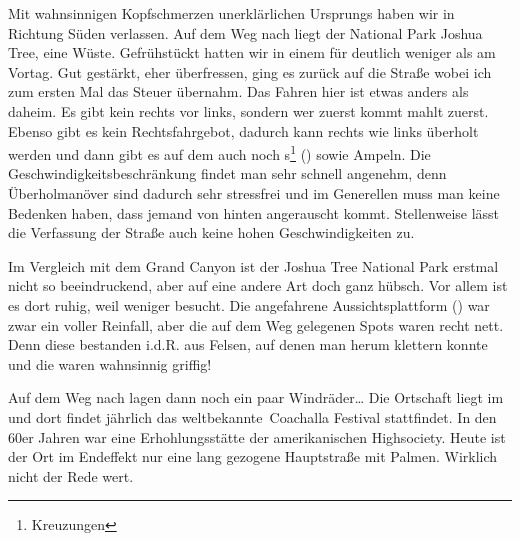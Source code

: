 Mit wahnsinnigen Kopfschmerzen unerklärlichen Ursprungs haben wir  in Richtung Süden verlassen.
Auf dem Weg nach  liegt der National Park Joshua Tree, eine Wüste.
Gefrühstückt hatten wir in einem  für deutlich weniger als am Vortag.
Gut gestärkt, eher überfressen, ging es zurück auf die Straße wobei ich zum ersten Mal das Steuer übernahm.
Das Fahren hier ist etwas anders als daheim.
Es gibt kein rechts vor links, sondern wer zuerst kommt mahlt zuerst.
Ebenso gibt es kein Rechtsfahrgebot, dadurch kann rechts wie links überholt werden und dann gibt es auf dem  auch noch s\footnote{Kreuzungen} () sowie Ampeln.
Die Geschwindigkeitsbeschränkung findet man sehr schnell angenehm, denn Überholmanöver sind dadurch sehr stressfrei und im Generellen muss man keine Bedenken haben, dass jemand von hinten angerauscht kommt.
Stellenweise lässt die Verfassung der Straße auch keine hohen Geschwindigkeiten zu.

Im Vergleich mit dem Grand Canyon ist der Joshua Tree National Park erstmal nicht so beeindruckend, aber auf eine andere Art doch ganz hübsch.
Vor allem ist es dort ruhig, weil weniger besucht.
Die angefahrene Aussichtsplattform () war zwar ein voller Reinfall, aber die auf dem Weg gelegenen Spots waren recht nett.
Denn diese bestanden i.d.R. aus Felsen, auf denen man herum klettern konnte und die waren wahnsinnig griffig!

Auf dem Weg nach  lagen dann noch ein paar Windräder\dots
Die Ortschaft liegt im  und dort findet jährlich das \glqq weltbekannte\grqq\, Coachalla Festival stattfindet.
In den 60er Jahren war  eine Erhohlungsstätte der amerikanischen Highsociety.
Heute ist der Ort im Endeffekt nur eine lang gezogene Hauptstraße mit Palmen.
Wirklich nicht der Rede wert.

\newpage
\thispagestyle{empty}
\newpage
